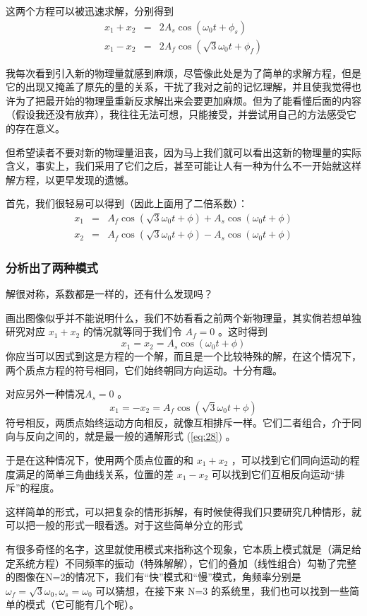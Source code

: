 \documentclass[11pt]{book}
\begin{document}
这两个方程可以被迅速求解，分别得到
\begin{eqnarray}
\label{eq:27}
x_1+x_2 & = & 2A_s\cos(\omega_0 t+\phi_s)\\
x_1-x_2 & = & 2A_f\cos(\sqrt{3}\omega_0 t+\phi_f)
\end{eqnarray}

我每次看到引入新的物理量就感到麻烦，尽管像此处是为了简单的求解方程，但是它的出现又掩盖了原先的量的关系，干扰了我对之前的记忆理解，并且使我觉得也许为了把最开始的物理量重新反求解出来会要更加麻烦。但为了能看懂后面的内容（假设我还没有放弃），我往往无法可想，只能接受，并尝试用自己的方法感受它的存在意义。

但希望读者不要对新的物理量沮丧，因为马上我们就可以看出这新的物理量的实际含义，事实上，我们采用了它们之后，甚至可能让人有一种为什么不一开始就这样解方程，以更早发现的遗憾。

首先，我们很轻易可以得到（因此上面用了二倍系数）：
\begin{eqnarray}
\label{eq:28}
x_1 & = & A_f\cos(\sqrt{3}\omega_0 t +\phi) + A_s\cos(\omega_0 t +\phi)\\
x_2 & = & A_f\cos(\sqrt{3}\omega_0 t +\phi) - A_s\cos(\omega_0 t +\phi)
\end{eqnarray}

\subsubsection{分析出了两种模式}
\label{sec:orgc90ea87}
解很对称，系数都是一样的，还有什么发现吗？

画出图像似乎并不能说明什么，我们不妨看看之前两个新物理量，其实倘若想单独研究对应 \(x_1+x_2\) 的情况就等同于我们令 \(A_f=0\) 。这时得到 $$x_1=x_2=A_s\cos(\omega_0 t +\phi)$$  
你应当可以因式到这是方程的一个解，而且是一个比较特殊的解，在这个情况下，两个质点方程的符号相同，它们始终朝同方向运动。十分有趣。

对应另外一种情况\(A_s=0\) 。
$$x_1=-x_2=A_f\cos(\sqrt{3}\omega_0 t +\phi)$$
符号相反，两质点始终运动方向相反，就像互相排斥一样。它们二者组合，介于同向与反向之间的，就是最一般的通解形式 (\ref{eq:28}) 。

于是在这种情况下，使用两个质点位置的和 \(x_1+x_2\) ，可以找到它们同向运动的程度满足的简单三角曲线关系，位置的差  \(x_1-x_2\) 可以找到它们互相反向运动“排斥”的程度。

这样简单的形式，可以把复杂的情形拆解，有时候使得我们只要研究几种情形，就可以把一般的形式一眼看透。对于这些简单分立的形式

有很多奇怪的名字，这里就使用模式来指称这个现象，它本质上模式就是（满足给定系统方程）不同频率的振动（特殊解解），它们的叠加（线性组合）勾勒了完整的图像在N=2的情况下，我们有“快”模式和“慢”模式，角频率分别是 \(\omega_f=\sqrt{3}\omega_0,\omega_s=\omega_{0}\)
可以猜想，在接下来 N=3 的系统里，我们也可以找到一些简单的模式（它可能有几个呢）。
\end{document}
